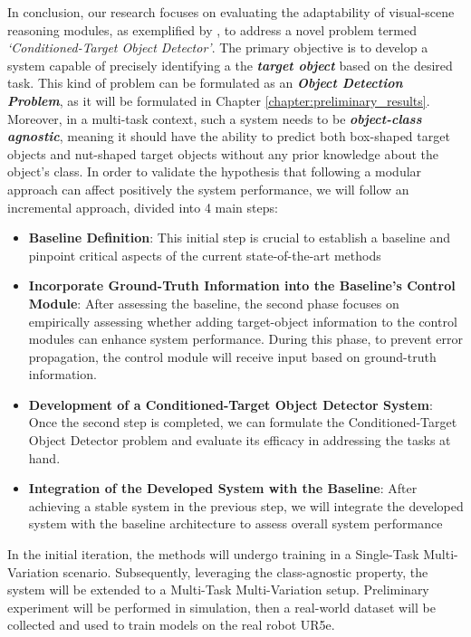 
In conclusion, our research focuses on evaluating the adaptability of visual-scene reasoning modules, as exemplified by \cite{perez2018film}, to address a novel problem termed \textit{`Conditioned-Target Object Detector'}. The primary objective is to develop a system capable of precisely identifying a the \textit{\textbf{target object}} based on the desired task. This kind of problem can be formulated as an \textbf{\textit{Object Detection Problem}}, as it will be formulated in Chapter \ref{chapter:preliminary_results}. Moreover, in a multi-task context, such a system needs to be \textit{\textbf{object-class agnostic}}, meaning it should have the ability to predict both box-shaped target objects and nut-shaped target objects without any prior knowledge about the object's class.
In order to validate the hypothesis that following a modular approach can affect positively the system performance, we will follow an incremental approach, divided into 4 main steps:
\begin{itemize}
    \item \textbf{Baseline Definition}: This initial step is crucial to establish a baseline and pinpoint critical aspects of the current state-of-the-art methods
    \item \textbf{Incorporate Ground-Truth Information into the Baseline's Control Module}: After assessing the baseline, the second phase focuses on empirically assessing whether adding target-object information to the control modules can enhance system performance. During this phase, to prevent error propagation, the control module will receive input based on ground-truth information.
    \item \textbf{Development of a Conditioned-Target Object Detector System}: Once the second step is completed, we can formulate the Conditioned-Target Object Detector problem and evaluate its efficacy in addressing the tasks at hand.
    \item \textbf{Integration of the Developed System with the Baseline}: After achieving a stable system in the previous step, we will integrate the developed system with the baseline architecture to assess overall system performance
\end{itemize}
In the initial iteration, the methods will undergo training in a Single-Task Multi-Variation scenario. Subsequently, leveraging the class-agnostic property, the system will be extended to a Multi-Task Multi-Variation setup.
Preliminary experiment will be performed in simulation, then a real-world dataset will be collected and used to train models on the real robot UR5e.

